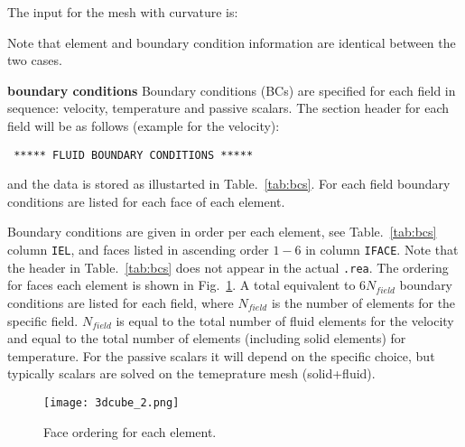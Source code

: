 \begin{description}


The input for the mesh with curvature is: 



Note that element and boundary condition information are identical between the two cases.

\item{\bf boundary conditions} 
     Boundary conditions (BCs) are specified for each field in sequence: velocity, temperature and passive scalars. The section header for each field will be as follows (example for the velocity):
     \begin{center}
     \texttt{ ***** FLUID   BOUNDARY CONDITIONS *****}

     \end{center}
     and the data is stored as illustarted in Table.~\ref{tab:bcs}. For each field boundary conditions are listed for each face of each element. 

Boundary conditions are given in order per each element, see Table.~\ref{tab:bcs} column \texttt{IEL}, and faces listed in ascending order $1-6$ in column \texttt{IFACE}. Note that the header in Table.~\ref{tab:bcs} does not appear in the actual \texttt{.rea}.
The ordering for faces each element is shown in Fig.~\ref{fig:forder}. A total equivalent to $6N_{field}$ boundary conditions are listed for each field, where $N_{field}$ is the number of elements for the specific field. $N_{field}$ is equal to the total number of fluid elements for the velocity and equal to the total number of elements (including solid elements) for temperature. For the passive scalars it will depend on the specific choice, but typically scalars are solved on the temeprature mesh (solid+fluid). 

\begin{figure}
\begin{center}
\texttt{[image: 3dcube\_2.png]}
\caption{Face ordering for each element.}
\label{fig:forder}
\end{center}
\end{figure}


\end{description}
